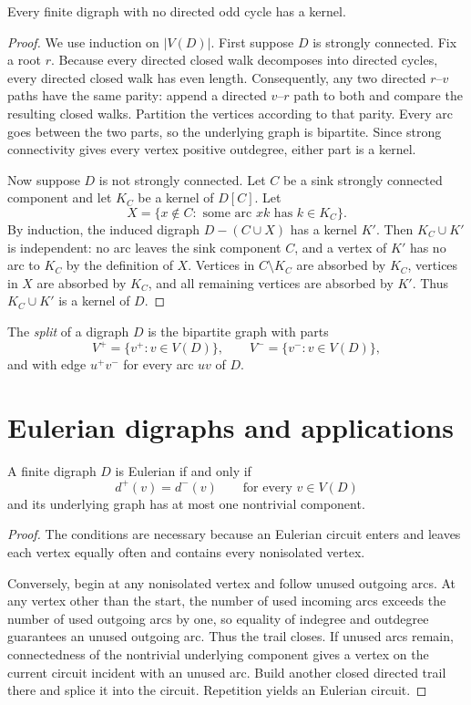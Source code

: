 \begin{notetheorem}[Richardson]
Every finite digraph with no directed odd cycle has a kernel.
\end{notetheorem}
\begin{proof}
We use induction on $|V(D)|$.  First suppose $D$ is strongly connected.  Fix a root $r$.  Because every directed closed walk decomposes into directed cycles, every directed closed walk has even length.  Consequently, any two directed $r$--$v$ paths have the same parity: append a directed $v$--$r$ path to both and compare the resulting closed walks.  Partition the vertices according to that parity.  Every arc goes between the two parts, so the underlying graph is bipartite.  Since strong connectivity gives every vertex positive outdegree, either part is a kernel.

Now suppose $D$ is not strongly connected.  Let $C$ be a sink strongly connected component and let $K_C$ be a kernel of $D[C]$.  Let
\[
  X=\{x\notin C:\text{ some arc }xk\text{ has }k\in K_C\}.
\]
By induction, the induced digraph $D-(C\cup X)$ has a kernel $K'$.  Then $K_C\cup K'$ is independent: no arc leaves the sink component $C$, and a vertex of $K'$ has no arc to $K_C$ by the definition of $X$.  Vertices in $C\setminus K_C$ are absorbed by $K_C$, vertices in $X$ are absorbed by $K_C$, and all remaining vertices are absorbed by $K'$.  Thus $K_C\cup K'$ is a kernel of $D$.
\end{proof}
\begin{notedefinition}
The \emph{split} of a digraph $D$ is the bipartite graph with parts
\[
  V^+=\{v^+:v\in V(D)\},
  \qquad
  V^-=\{v^-:v\in V(D)\},
\]
and with edge $u^+v^-$ for every arc $uv$ of $D$.
\end{notedefinition}
\section{Eulerian digraphs and applications}

\begin{notetheorem}
A finite digraph $D$ is Eulerian if and only if
\[
  d^+(v)=d^-(v)\qquad\text{for every }v\in V(D)
\]
and its underlying graph has at most one nontrivial component.
\end{notetheorem}
\begin{proof}
The conditions are necessary because an Eulerian circuit enters and leaves each vertex equally often and contains every nonisolated vertex.

Conversely, begin at any nonisolated vertex and follow unused outgoing arcs.  At any vertex other than the start, the number of used incoming arcs exceeds the number of used outgoing arcs by one, so equality of indegree and outdegree guarantees an unused outgoing arc.  Thus the trail closes.  If unused arcs remain, connectedness of the nontrivial underlying component gives a vertex on the current circuit incident with an unused arc.  Build another closed directed trail there and splice it into the circuit.  Repetition yields an Eulerian circuit.
\end{proof}

